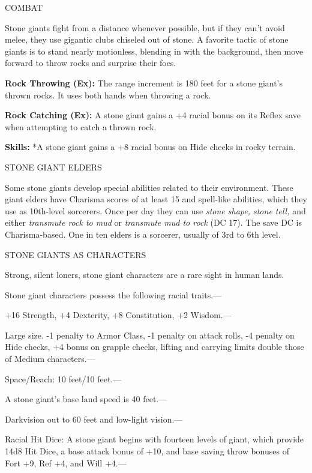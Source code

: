 \documentclass{article}
\begin{document}
COMBAT

Stone giants fight from a distance whenever possible, but if they can't avoid melee, 
they use gigantic clubs chiseled out of stone. A favorite tactic of stone giants 
is to stand nearly motionless, blending in with the background, then move forward 
to throw rocks and surprise their foes.

\textbf{Rock Throwing (Ex):} The range increment is 180 feet for a stone giant's 
thrown rocks. It uses both hands when throwing a rock.

\textbf{Rock Catching (Ex):} A stone giant gains a +4 racial bonus on its Reflex 
save when attempting to catch a thrown rock.

\textbf{Skills:} *A stone giant gains a +8 racial bonus on Hide checks in rocky 
terrain.

\vspace{12pt}
STONE GIANT ELDERS

Some stone giants develop special abilities related to their environment. These 
giant elders have Charisma scores of at least 15 and spell-like abilities, which 
they use as 10th-level sorcerers. Once per day they can use \textit{stone shape, 
stone tell, }and either \textit{transmute rock to mud }or \textit{transmute mud 
to rock }(DC 17). The save DC is Charisma-based. One in ten elders is a sorcerer, 
usually of 3rd to 6th level.

\vspace{12pt}
STONE GIANTS AS CHARACTERS

Strong, silent loners, stone giant characters are a rare sight in human lands.

Stone giant characters possess the following racial traits.--- 

\parindent=3pt
+16 Strength, +4 Dexterity, +8 Constitution, +2 Wisdom.---

\parindent=0pt
Large size. -1 penalty to Armor Class, -1 penalty on attack rolls, -4 penalty on 
Hide checks, +4 bonus on grapple checks, lifting and carrying limits double those 
of Medium characters.---

Space/Reach: 10 feet/10 feet.---

A stone giant's base land speed is 40 feet.---

Darkvision out to 60 feet and low-light vision.---

Racial Hit Dice: A stone giant begins with fourteen levels of giant, which provide 
14d8 Hit Dice, a base attack bonus of +10, and base saving throw bonuses of Fort 
+9, Ref +4, and Will +4.---
\end{document}
